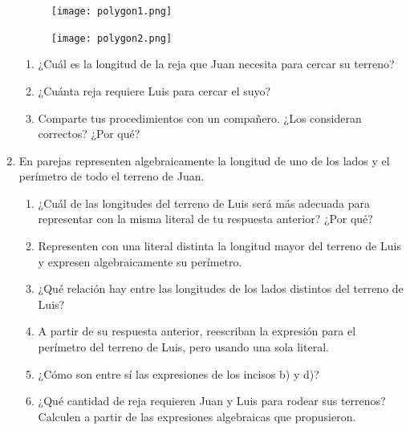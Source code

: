 \documentclass[11pt]{book}
\begin{document}
\begin{enumerate}
        \begin{minipage}{0.45\textwidth}
          \begin{figure}[H]
            \centering
            \texttt{[image: polygon1.png]}
            \label{fig:polygon1}
          \end{figure}
        \end{minipage}\hfill
        \begin{minipage}{0.45\textwidth}
          \begin{figure}[H]
            \centering
            \texttt{[image: polygon2.png]}
            \label{fig:polygon2}
          \end{figure}
        \end{minipage}

        \begin{enumerate}
          \item ¿Cuál es la longitud de la reja que Juan necesita para cercar su terreno?
          \item ¿Cuánta reja requiere Luis para cercar el suyo?
          \item Comparte tus procedimientos con un compañero. ¿Los consideran correctos? ¿Por qué?
        \end{enumerate}
  \item En parejas representen algebraicamente la longitud de uno de los lados y el perímetro de todo el terreno de Juan.
        \begin{enumerate}
          \item ¿Cuál de las longitudes del terreno de Luis será más adecuada para representar con la misma literal de tu
                respuesta anterior? ¿Por qué?
          \item Representen con una literal distinta la longitud mayor del terreno de Luis y expresen algebraicamente su
                perímetro.
          \item ¿Qué relación hay entre las longitudes de los lados distintos del terreno de Luis?
          \item A partir de su respuesta anterior, reescriban la expresión para el perímetro del terreno de Luis,
                pero usando una sola literal.
          \item ¿Cómo son entre sí las expresiones de los incisos b) y d)?
          \item ¿Qué cantidad de reja requieren Juan y Luis para rodear sus terrenos? Calculen a partir de las
                expresiones algebraicas que propusieron.
        \end{enumerate}


\end{enumerate}
\end{document}
